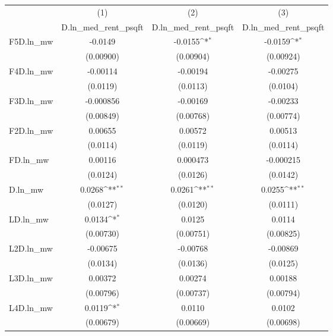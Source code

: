 {
\def\sym#1{\ifmmode^{#1}\else\(^{#1}\)\fi}
\begin{tabular}{l*{3}{c}}
\hline\hline
          &\multicolumn{1}{c}{(1)}&\multicolumn{1}{c}{(2)}&\multicolumn{1}{c}{(3)}\\
          &\multicolumn{1}{c}{D.ln\_med\_rent\_psqft}&\multicolumn{1}{c}{D.ln\_med\_rent\_psqft}&\multicolumn{1}{c}{D.ln\_med\_rent\_psqft}\\
\hline
F5D.ln\_mw &  -0.0149         &  -0.0155\sym{*}  &  -0.0159\sym{*}  \\
          &(0.00900)         &(0.00904)         &(0.00924)         \\
[1em]
F4D.ln\_mw & -0.00114         & -0.00194         & -0.00275         \\
          & (0.0119)         & (0.0113)         & (0.0104)         \\
[1em]
F3D.ln\_mw &-0.000856         & -0.00169         & -0.00233         \\
          &(0.00849)         &(0.00768)         &(0.00774)         \\
[1em]
F2D.ln\_mw &  0.00655         &  0.00572         &  0.00513         \\
          & (0.0114)         & (0.0119)         & (0.0114)         \\
[1em]
FD.ln\_mw  &  0.00116         & 0.000473         &-0.000215         \\
          & (0.0124)         & (0.0126)         & (0.0142)         \\
[1em]
D.ln\_mw   &   0.0268\sym{**} &   0.0261\sym{**} &   0.0255\sym{**} \\
          & (0.0127)         & (0.0120)         & (0.0111)         \\
[1em]
LD.ln\_mw  &   0.0134\sym{*}  &   0.0125         &   0.0114         \\
          &(0.00730)         &(0.00751)         &(0.00825)         \\
[1em]
L2D.ln\_mw & -0.00675         & -0.00768         & -0.00869         \\
          & (0.0134)         & (0.0136)         & (0.0125)         \\
[1em]
L3D.ln\_mw &  0.00372         &  0.00274         &  0.00188         \\
          &(0.00796)         &(0.00737)         &(0.00794)         \\
[1em]
L4D.ln\_mw &   0.0119\sym{*}  &   0.0110         &   0.0102         \\
          &(0.00679)         &(0.00669)         &(0.00698)         \\

\end{tabular}}
